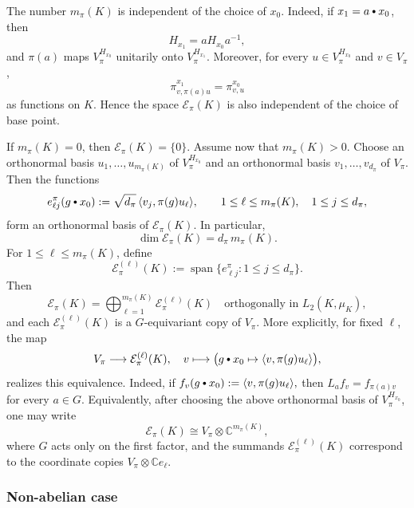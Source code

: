 \documentclass[11pt,showkeys]{amsart}
\newcommand{\hbullet}{\mathbin{\vcenter{\hbox{\scalebox{0.7}{$\bullet$}}}}}
\begin{document}
The number \(m_\pi(K)\) is independent of the choice of \(x_0\). Indeed, if
\(x_1=a\hbullet x_0\), then
\[
        H_{x_1}=aH_{x_0}a^{-1},
\]
and \(\pi(a)\) maps \(V_\pi^{H_{x_0}}\) unitarily onto
\(V_\pi^{H_{x_1}}\). Moreover, for every
\(u\in V_\pi^{H_{x_0}}\) and \(v\in V_\pi\),
\[
        \pi^{x_1}_{v,\pi(a)u}
        =
        \pi^{x_0}_{v,u}
\]
as functions on \(K\). Hence the space \(\mathcal E_\pi(K)\) is also
independent of the choice of base point.

If \(m_\pi(K)=0\), then
\(\mathcal E_\pi(K)=\{0\}\).
Assume now that \(m_\pi(K)>0\). Choose an orthonormal basis
\(u_1,\ldots,u_{m_\pi(K)}\) of \(V_\pi^{H_{x_0}}\) and an orthonormal
basis \(v_1,\ldots,v_{d_\pi}\) of \(V_\pi\). Then the functions
\[
        e^\pi_{\ell j}(g\hbullet x_0)
        :=
        \sqrt{d_\pi}\,
        \langle v_j,\pi(g)u_\ell\rangle,
        \qquad
        1\leq \ell\leq m_\pi(K),\quad 1\leq j\leq d_\pi,
\]
form an orthonormal basis of \(\mathcal E_\pi(K)\). In particular,
\[
        \dim \mathcal E_\pi(K)=d_\pi\,m_\pi(K).
\]
For \(1\leq \ell\leq m_\pi(K)\), define
\[
        \mathcal E_\pi^{(\ell)}(K)
        :=
        \operatorname{span}
        \{e^\pi_{\ell j}:1\leq j\leq d_\pi\}.
\]
Then
\[
        \mathcal E_\pi(K)
        =
        \bigoplus_{\ell=1}^{m_\pi(K)}
        \mathcal E_\pi^{(\ell)}(K)
        \quad \text{orthogonally in \(L_2(K,\mu_K),\)}
\]
 and each \(\mathcal E_\pi^{(\ell)}(K)\) is a \(G\)-equivariant copy of \(V_\pi\).
More explicitly, for fixed \(\ell\), the map
\[
        V_\pi\longrightarrow \mathcal E_\pi^{(\ell)}(K),
        \quad
        v\longmapsto
        \big(g\hbullet x_0\mapsto \langle v,\pi(g)u_\ell\rangle\big),
\]
realizes this equivalence. Indeed, if
\(
    f_v(g\hbullet x_0):=\langle v,\pi(g)u_\ell\rangle,
\)
then
\(
    L_af_v=f_{\pi(a)v}
\)
for every \(a\in G\).
Equivalently, after choosing the above orthonormal basis of
\(V_\pi^{H_{x_0}}\), one may write
\begin{equation} \label{eq:tensor description}
     \mathcal E_\pi(K)
        \cong
        V_\pi\otimes \mathbb C^{m_\pi(K)},
\end{equation}
where \(G\) acts only on the first factor, and the summands
\(\mathcal E_\pi^{(\ell)}(K)\) correspond to the coordinate copies
\(V_\pi\otimes\mathbb C e_\ell\).


\subsubsection{Non-abelian case}
\end{document}

